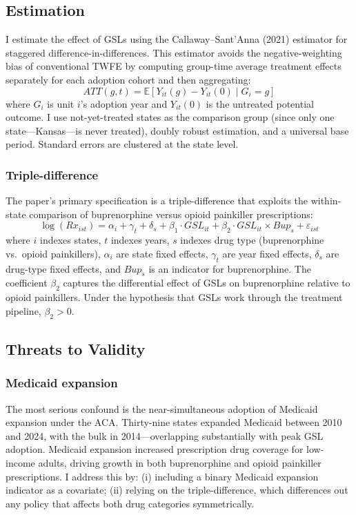 \documentclass[12pt]{article}
\newcommand{\E}{\mathbb{E}}
\begin{document}
\subsection{Estimation}

I estimate the effect of GSLs using the Callaway--Sant'Anna (2021) estimator for staggered difference-in-differences. This estimator avoids the negative-weighting bias of conventional TWFE by computing group-time average treatment effects separately for each adoption cohort and then aggregating:
\begin{equation}
    ATT(g,t) = \E[Y_{it}(g) - Y_{it}(0) \mid G_i = g]
\end{equation}
where $G_i$ is unit $i$'s adoption year and $Y_{it}(0)$ is the untreated potential outcome. I use not-yet-treated states as the comparison group (since only one state---Kansas---is never treated), doubly robust estimation, and a universal base period. Standard errors are clustered at the state level.

\subsubsection*{Triple-difference} The paper's primary specification is a triple-difference that exploits the within-state comparison of buprenorphine versus opioid painkiller prescriptions:
\begin{equation}
    \log(Rx_{ist}) = \alpha_i + \gamma_t + \delta_s + \beta_1 \cdot GSL_{it} + \beta_2 \cdot GSL_{it} \times Bup_s + \varepsilon_{ist}
\end{equation}
where $i$ indexes states, $t$ indexes years, $s$ indexes drug type (buprenorphine vs.\ opioid painkillers), $\alpha_i$ are state fixed effects, $\gamma_t$ are year fixed effects, $\delta_s$ are drug-type fixed effects, and $Bup_s$ is an indicator for buprenorphine. The coefficient $\beta_2$ captures the differential effect of GSLs on buprenorphine relative to opioid painkillers. Under the hypothesis that GSLs work through the treatment pipeline, $\beta_2 > 0$.

\subsection{Threats to Validity}

\subsubsection*{Medicaid expansion} The most serious confound is the near-simultaneous adoption of Medicaid expansion under the ACA. Thirty-nine states expanded Medicaid between 2010 and 2024, with the bulk in 2014---overlapping substantially with peak GSL adoption. Medicaid expansion increased prescription drug coverage for low-income adults, driving growth in both buprenorphine and opioid painkiller prescriptions. I address this by: (i) including a binary Medicaid expansion indicator as a covariate; (ii) relying on the triple-difference, which differences out any policy that affects both drug categories symmetrically.
\end{document}
